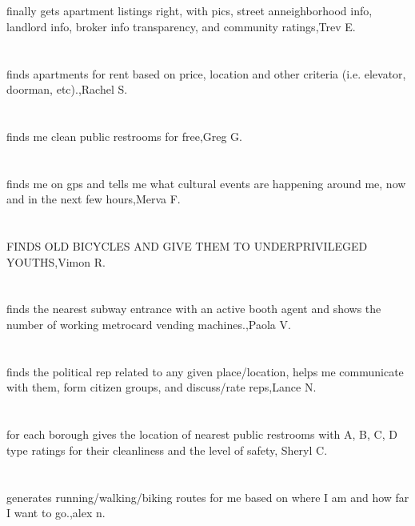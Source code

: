 \section{}finally gets apartment listings right, with pics, street anneighborhood info, landlord info, broker info transparency, and community ratings,Trev E.
\section{}finds apartments for rent based on price, location and other criteria (i.e. elevator, doorman, etc).,Rachel S.
\section{} finds me clean public restrooms for free,Greg  G.
\section{}finds me on gps and tells me what cultural events are happening around me, now and in the next few hours,Merva F.
\section{} FINDS OLD BICYCLES AND GIVE THEM TO UNDERPRIVILEGED YOUTHS,Vimon R.
\section{}finds the nearest subway entrance with an active booth agent and shows the number of working metrocard vending machines.,Paola V.
\section{}finds the political rep related to any given place/location, helps me communicate with them, form citizen groups, and discuss/rate reps,Lance N.
\section{}for each borough gives the location of nearest public restrooms with A, B, C, D type ratings for their cleanliness and the level of safety, Sheryl C.
\section{}generates running/walking/biking routes for me based on where I am and how far I want to go.,alex n.
